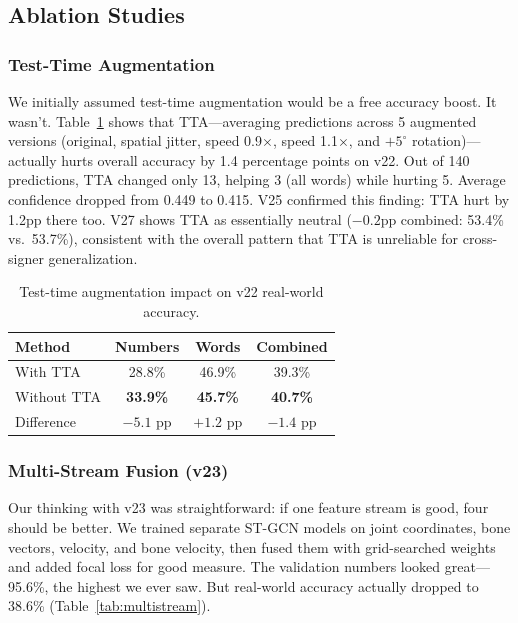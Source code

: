 \documentclass[conference]{IEEEtran}
\begin{document}
\subsection{Ablation Studies}

\subsubsection{Test-Time Augmentation}
We initially assumed test-time augmentation would be a free accuracy boost. It wasn't. Table~\ref{tab:tta} shows that TTA---averaging predictions across 5 augmented versions (original, spatial jitter, speed 0.9$\times$, speed 1.1$\times$, and $+5^{\circ}$ rotation)---actually hurts overall accuracy by 1.4 percentage points on v22. Out of 140 predictions, TTA changed only 13, helping 3 (all words) while hurting 5. Average confidence dropped from 0.449 to 0.415. V25 confirmed this finding: TTA hurt by 1.2pp there too. V27 shows TTA as essentially neutral ($-0.2$pp combined: 53.4\% vs.\ 53.7\%), consistent with the overall pattern that TTA is unreliable for cross-signer generalization.

\begin{table}[t]
\centering
\caption{Test-time augmentation impact on v22 real-world accuracy.}
\label{tab:tta}
\small
\begin{tabular}{@{}lccc@{}}
\toprule
\textbf{Method} & \textbf{Numbers} & \textbf{Words} & \textbf{Combined} \\
\midrule
With TTA & 28.8\% & 46.9\% & 39.3\% \\
Without TTA & \textbf{33.9\%} & \textbf{45.7\%} & \textbf{40.7\%} \\
\midrule
Difference & $-5.1$ pp & $+1.2$ pp & $-1.4$ pp \\
\bottomrule
\end{tabular}
\end{table}

\subsubsection{Multi-Stream Fusion (v23)}
\label{sec:multistream_v23}
Our thinking with v23 was straightforward: if one feature stream is good, four should be better. We trained separate ST-GCN models on joint coordinates, bone vectors, velocity, and bone velocity, then fused them with grid-searched weights and added focal loss for good measure. The validation numbers looked great---95.6\%, the highest we ever saw. But real-world accuracy actually dropped to 38.6\% (Table~\ref{tab:multistream}).
\end{document}
